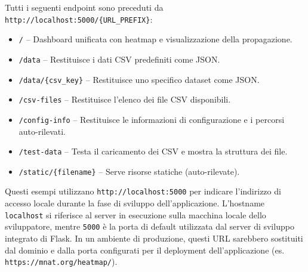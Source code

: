 Tutti i seguenti endpoint sono preceduti da \texttt{http://localhost:5000/\{URL\_PREFIX\}}:

\begin{itemize}
  \item \texttt{/} -- Dashboard unificata con heatmap e visualizzazione della propagazione.

  \item \texttt{/data} -- Restituisce i dati CSV predefiniti come JSON.

  \item \texttt{/data/\{csv\_key\}} -- Restituisce uno specifico dataset come JSON.

  \item \texttt{/csv-files} -- Restituisce l'elenco dei file CSV disponibili.

  \item \texttt{/config-info} -- Restituisce le informazioni di configurazione e
    i percorsi auto-rilevati.

  \item \texttt{/test-data} -- Testa il caricamento dei CSV e mostra la struttura
    dei file.

  \item \texttt{/static/\{filename\}} -- Serve risorse statiche (auto-rilevate).
\end{itemize}

\noindent
Questi esempi utilizzano \texttt{http://localhost:5000} per indicare l'indirizzo
di accesso locale durante la fase di sviluppo dell'applicazione. L'hostname
\texttt{localhost} si riferisce al server in esecuzione sulla macchina locale dello
sviluppatore, mentre \texttt{5000} è la porta di default utilizzata dal server di
sviluppo integrato di Flask. In un ambiente di produzione, questi URL sarebbero sostituiti
dal dominio e dalla porta configurati per il deployment dell'applicazione (es. \texttt{https://mnat.org/heatmap/}).

\newpage